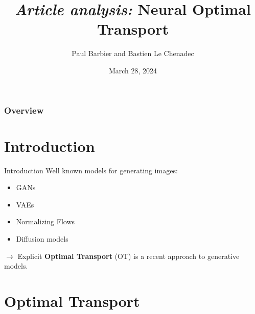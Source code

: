 \documentclass{beamer}
\title[Generative Images]{\textit{Article analysis:} Neural Optimal Transport} %
\author{Paul Barbier and Bastien Le Chenadec} %
\institute[MVA, Ponts] %
\date{March 28, 2024} %
\begin{document}
\begin{frame}
    \titlepage%
\end{frame}

\begin{frame}
    \frametitle{Overview} %
    \tableofcontents %
\end{frame}


\section{Introduction}
\begin{frame}{Introduction}
    Well known models for generating images:
    \begin{itemize}
        \item GANs
        \item VAEs
        \item Normalizing Flows
        \item Diffusion models
    \end{itemize}

    $\rightarrow$ Explicit \textbf{Optimal Transport} (OT) is a recent approach to generative models.
\end{frame}

\section{Optimal Transport}
\end{document}
